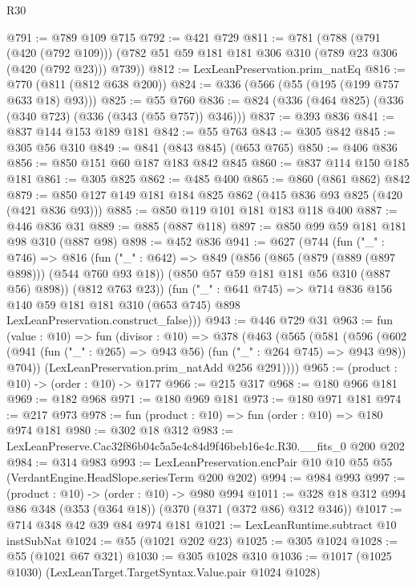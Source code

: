 \begin{lexlean}{R30}
\begin{coremodule}
@791 := @789 @109 @715
@792 := @421 @729
@811 := @781
    (@788
      (@791 (@420 (@792 @109)))
      (@782 @51 @59 @181 @181 @306 @310 (@789 @23 @306 (@420 (@792 @23))) @739))
@812 := LexLeanPreservation.prim_natEq
@816 := @770 (@811 (@812 @638 @200))
@824 := @336 (@566 (@55 (@195 (@199 @757 @633 @18) @93)))
@825 := @55 @760
@836 := @824 (@336 (@464 @825) (@336 (@340 @723) (@336 (@343 (@55 @757)) @346)))
@837 := @393 @836
@841 := @837 @144 @153 @189 @181
@842 := @55 @763
@843 := @305 @842
@845 := @305 @56 @310
@849 := @841 (@843 @845) (@653 @765)
@850 := @406 @836
@856 := @850 @151 @60 @187 @183 @842 @845
@860 := @837 @114 @150 @185 @181
@861 := @305 @825
@862 := @485 @400
@865 := @860 (@861 @862) @842
@879 := @850 @127 @149 @181 @184 @825 @862 (@415 @836 @93 @825 (@420 (@421 @836 @93)))
@885 := @850 @119 @101 @181 @183 @118 @400
@887 := @446 @836 @31
@889 := @885 (@887 @118)
@897 := @850 @99 @59 @181 @181 @98 @310 (@887 @98)
@898 := @452 @836
@941 := @627
    (@744
      (fun ("_" : @746) =>
      @816
        (fun ("_" : @642) =>
        @849
          (@856
            (@865 (@879 (@889 (@897 @898))) (@544 @760 @93 @18))
            (@850 @57 @59 @181 @181 @56 @310 (@887 @56) @898))
          (@812 @763 @23))
        (fun ("_" : @641 @745) =>
        @714
          @836
          @156
          @140
          @59
          @181
          @181
          @310
          (@653 @745)
          @898
          LexLeanPreservation.construct_false)))
@943 := @446 @729 @31
@963 := fun (value : @10) =>
  fun (divisor : @10) =>
  @378
    (@463
      (@565
        (@581
          (@596
            (@602 (@941 (fun ("_" : @265) => @943 @56) (fun ("_" : @264 @745) => @943 @98)) @704))
          (LexLeanPreservation.prim_natAdd @256 @291))))
@965 := (product : @10) -> (order : @10) -> @177
@966 := @215 @317
@968 := @180 @966 @181
@969 := @182 @968
@971 := @180 @969 @181
@973 := @180 @971 @181
@974 := @217 @973
@978 := fun (product : @10) => fun (order : @10) => @180 @974 @181
@980 := @302 @18 @312
@983 := LexLeanPreserve.Cac32f86b04c5a5e4c84d9f46beb16e4c.R30.__fits_0 @200 @202
@984 := @314 @983
@993 := LexLeanPreservation.encPair @10 @10 @55 @55 (VerdantEngine.HeadSlope.seriesTerm @200 @202)
@994 := @984 @993
@997 := (product : @10) -> (order : @10) -> @980 @994
@1011 := @328 @18 @312 @994 @86 @348 (@353 (@364 @18)) (@370 (@371 (@372 @86) @312 @346))
@1017 := @714 @348 @42 @39 @84 @974 @181
@1021 := LexLeanRuntime.subtract @10 instSubNat
@1024 := @55 (@1021 @202 @23)
@1025 := @305 @1024
@1028 := @55 (@1021 @67 @321)
@1030 := @305 @1028 @310
@1036 := @1017 (@1025 @1030) (LexLeanTarget.TargetSyntax.Value.pair @1024 @1028)

\end{coremodule}
\end{lexlean}

